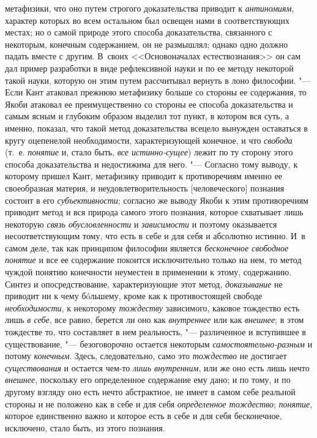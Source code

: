 метафизики, что оно путем строгого доказательства приводит к
{\em антиномиям},
характер которых во всем остальном был освещен нами в
соответствующих местах; но о самой природе этого способа доказательства,
связанного с некоторым, конечным содержанием, он не размышлял; однако одно
должно падать вместе с другим. В~своих <<Основоначалах
естествознания>>
он сам дал пример разработки в виде рефлексивной науки и по
ее методу некоторой такой науки, которую он этим путем рассчитывал вернуть
в лоно философии. "--- Если Кант атаковал прежнюю метафизику
больше со стороны ее содержания, то Якоби атаковал ее преимущественно со
стороны ее способа доказательства и самым ясным и глубоким образом выделил
тот пункт, в котором вся суть, а именно, показал, что такой метод
доказательства всецело вынужден оставаться в кругу оцепенелой
необходимости, характеризующей конечное, и что {\em свобода}
(т.~е. {\em понятие} и, стало быть, {\em все истинно-}{\em сущее})
лежит по ту сторону этого способа доказательства и
недостижима для него. "--- Согласно тому выводу, к которому
пришел Кант, метафизику приводит к противоречиям именно ее своеобразная
материя, и неудовлетворительность [человеческого] познания состоит в его
{\em субъективности}; согласно же выводу Якоби к этим противоречиям приводит
метод и вся природа самого этого познания, которое схватывает лишь некоторую
{\em связь обусловленности} и {\em зависимости}
и поэтому оказывается несоответствующим тому, что есть в себе
и для себя и абсолютно истинно. И~в самом деле, так как принципом философии
является {\em бесконечное свободное
понятие} и все ее содержание покоится исключительно только
на нем, то метод чуждой понятию конечности неуместен в применении к этому,
содержанию. Синтез и опосредствование, характеризующие этот метод,
{\em доказывание} не
приводит ни к чему бóльшему, кроме как к противостоящей свободе
{\em необходимости}, к
некоторому {\em тождеству}
зависимого, каковое тождество есть лишь
{\em в себе}, все равно,
берется ли оно как {\em внутреннее}
или как {\em внешнее};
в этом тождестве то, что составляет в нем реальность, "---
различенное и вступившее в существование, "---
безоговорочно остается некоторым
{\em самостоятельно-разным}
и потому {\em конечным}.
Здесь, следовательно, само это
{\em тождество} не
достигает {\em существования}
и остается чем-то
{\em лишь внутренним},
или же оно есть лишь нечто
{\em внешнее}, поскольку
его определенное содержание ему дано; и по тому, и по другому взгляду оно
есть нечто абстрактное, не имеет в самом себе реальной стороны и не
положено как в себе и для себя
{\em определенное тождество};
{\em понятие}, которое
единственно важно и которое есть в себе и для себя бесконечное, исключено,
стало быть, из этого познания.

